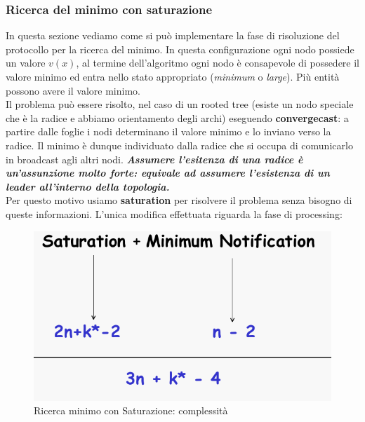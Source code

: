 \documentclass[12pt]{article}
\begin{document}
		\subsubsection{Ricerca del minimo con saturazione}
			In questa sezione vediamo come si può implementare la fase di risoluzione del protocollo per la ricerca del minimo. In questa configurazione ogni nodo possiede un valore $v(x)$, al termine dell'algoritmo ogni nodo è consapevole di possedere il valore minimo ed entra nello stato appropriato (\textit{minimum} o \textit{large}). Più entità possono avere il valore minimo.\\
			Il problema può essere risolto, nel caso di un rooted tree (esiste un nodo speciale che è la radice e abbiamo orientamento degli archi) eseguendo \textbf{convergecast}: a partire dalle foglie i nodi determinano il valore minimo e lo inviano verso la radice. Il minimo è dunque individuato dalla radice che si occupa di comunicarlo in broadcast agli altri nodi. \textbf{\textit{Assumere l'esitenza di una radice è un'assunzione molto forte:  equivale ad assumere l'esistenza di un leader all'interno della topologia.}} \\
			Per questo motivo usiamo \textbf{saturation} per risolvere il problema senza bisogno di queste informazioni. L'unica modifica effettuata riguarda la fase di processing:
			\begin{figure}[h!]
				\centering
				\includegraphics[scale=0.3]{img/mincomp.png}
				\caption{Ricerca minimo con Saturazione: complessità}
			\end{figure}
		
\end{document}
